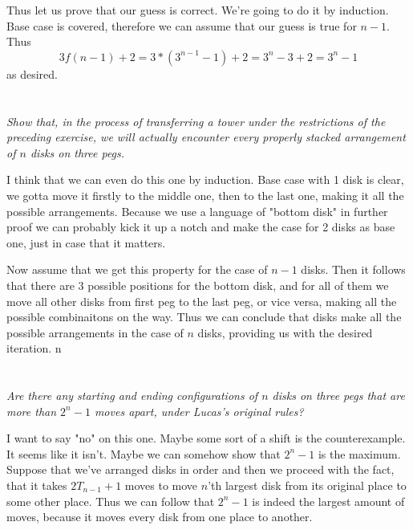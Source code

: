 \documentclass[11pt,oneside,titlepage]{book}
\begin{document}
Thus let us prove that our guess is correct. We're going to do it by induction. Base case is
covered, therefore we can assume that our guess is true for $n - 1$. Thus
$$3f(n - 1) + 2 = 3* (3^{n - 1} - 1) + 2 = 3^n - 3 + 2 = 3^n - 1$$
as desired.

\section{}

\textit{Show that, in the process of transferring a tower under the restrictions of the preceding
  exercise, we will actually encounter every properly stacked arrangement of $n$ disks
  on three pegs.}

I think that we can even do this one by induction. Base case with 1 disk is clear, we gotta
move it firstly to the middle one, then to the last one, making it all the possible arrangements.
Because we use a language of "bottom disk" in further proof we can probably kick it up a notch
and make the case for 2 disks as base one, just in case that it matters.

Now assume that we get this property for the case of $n - 1$ disks. Then it follows that
there are 3 possible positions for the bottom disk, and for all of them we move all other disks
from first peg to the last peg, or vice versa, making all the possible combinaitons on the way.
Thus we can conclude that disks make all the possible arrangements in the case of $n$ disks,
providing us with the desired iteration.
n
\section{}

\textit{Are there any starting and ending configurations of $n$ disks on three pegs that
  are more than $2^n - 1$ moves apart, under Lucas's original rules?}

I want to say "no" on this one. Maybe some sort of a shift is the counterexample. It seems
like it isn't. Maybe we can somehow show that $2^n - 1$ is the  maximum.
Suppose that we've arranged
disks in order and then we proceed with the fact, that it takes $2T_{n - 1} + 1$ moves to move
$n$'th largest disk from its original place to some other place. Thus we can follow that
$2^n - 1$ is indeed the largest amount of moves, because it moves every disk from one
place to another.

\section{}
\end{document}
